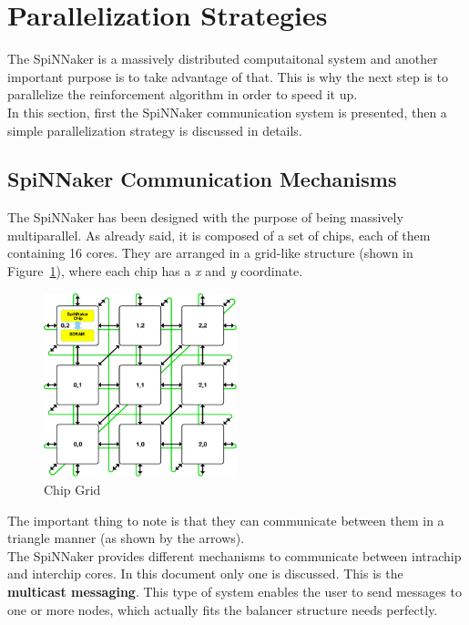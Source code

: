 \documentclass{article}
\begin{document}
\section{Parallelization Strategies}
The SpiNNaker is a massively distributed computaitonal system and another important purpose is to take advantage of that. This is why the next step is to parallelize the reinforcement algorithm in order to speed it up.\\
In this section, first the SpiNNaker communication system is presented, then a simple parallelization strategy is discussed in details.


\subsection{SpiNNaker Communication Mechanisms}
The SpiNNaker has been designed with the purpose of being massively multiparallel. As already said, it is composed of a set of chips, each of them containing 16 cores. They are arranged in a grid-like structure (shown in Figure~\ref{fig:grid}), where each chip has a \textit{x} and \textit{y} coordinate. 

\begin{figure}[h]
\begin{center}
\includegraphics[width=0.5\textwidth]{grid}
\caption{Chip Grid}
\label{fig:grid}
\end{center}
\end{figure}

The important thing to note is that they can communicate between them in a triangle manner (as shown by the arrows).\\

The SpiNNaker provides different mechanisms to communicate between intrachip and interchip cores. In this document only one is discussed. This is the \textbf{multicast messaging}. This type of system enables the user to send messages to one or more nodes, which actually fits the balancer structure needs perfectly.\\
\end{document}

